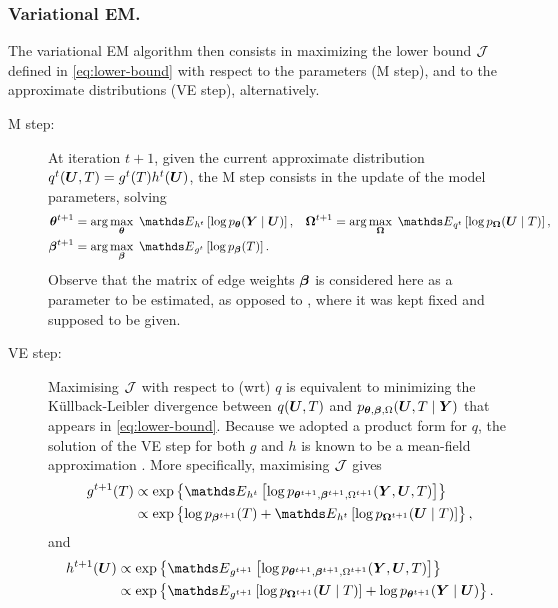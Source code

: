 \subsubsection*{Variational EM.}
The variational EM algorithm then consists in maximizing the lower bound ${\mathcal{J}}$ defined in \eqref{eq:lower-bound} with respect to the parameters (M step), and to the approximate distributions (VE step), alternatively. 
\begin{description}
\item[M step:] At iteration $t+1$, given the current approximate distribution $q^t({\boldsymbol{U}}, T) = g^t(T) h^t({\boldsymbol{U}})$, the M step consists in the update of the model parameters, solving 
\begin{align} \label{eq:Mstep}
\thetabf^{t+1} & = \arg\max_\thetabf \; \Esp_{h^t} \left[ \log p_\thetabf(\Ybf \mid \Ubf) \right], 
& \Omegabf^{t+1} & = \arg\max_\Omegabf \; \Esp_{q^t} \left[ \log p_{\Omegabf}(\Ubf \mid T) \right], \nonumber \\
\betabf^{t+1} & = \arg\max_\betabf \; \Esp_{g^t} \left[ \log p_\betabf(T) \right].
\end{align}
Observe that the matrix of edge weights ${\boldsymbol{\beta}}$ is considered here as a parameter to be estimated, as opposed to \cite{RAR19}, where it was kept fixed and supposed to be given.
%
\item[VE step:] Maximising ${\mathcal{J}}$ with respect to (wrt) $q$ is equivalent to minimizing the K\"ullback-Leibler divergence between $q({\boldsymbol{U}}, T)$ and $p_{{\boldsymbol{\theta}}, {\boldsymbol{\beta}}, \Omega}({\boldsymbol{U}}, T \mid {\boldsymbol{Y}})$ that appears in \eqref{eq:lower-bound}. Because we adopted a product form for $q$, the solution of the VE step for both $g$ and $h$ is known to be a mean-field approximation \citep{WaJ08}. More specifically, maximising ${\mathcal{J}}$ gives
\begin{align} \label{eq:VEstep-g}
g^{t+1}(T) 
& \propto \exp \left\{ \Esp_{h^t} \left[ \log p_{\thetabf^{t+1}, \betabf^{t+1}, \Omega^{t+1}}(\Ybf, \Ubf, T) \right] \right\} \nonumber \\
& \propto \exp \left\{ \log p_{\betabf^{t+1}}(T) + \Esp_{h^t} \left[ \log p_{\Omegabf^{t+1}}(\Ubf \mid T) \right] \right\},
\end{align}
and
\begin{align} \label{eq:VEstep-hH}
h^{t+1}(\Ubf) 
& \propto \exp \left\{ \Esp_{g^{t+1}} \left[ \log p_{\thetabf^{t+1}, \betabf^{t+1}, \Omega^{t+1}}(\Ybf, \Ubf, T) \right] \right\} \nonumber \\
& \propto \exp \left\{ \Esp_{g^{t+1}} \left[ \log p_{\Omegabf^{t+1}}(\Ubf \mid T) \right] + \log p_{\thetabf^{t+1}}(\Ybf \mid \Ubf) \right\}. 
\end{align}
\end{description}

